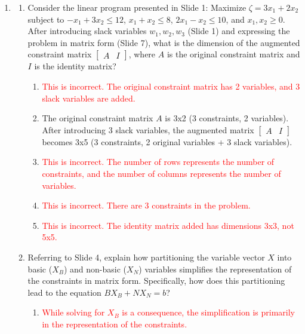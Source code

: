 \documentclass{article}%
\newcommand{\incorrect}[1]{\textcolor{red}{#1}}
\begin{document}
\begin{enumerate}
\begin{enumerate}
\item \incorrect{The initial basic feasible solution can be determined using the given matrix equation.}%
\end{enumerate}%
\vspace{1em}%
\item%
\begin{enumerate}%
\item Consider the linear program presented in Slide 1: Maximize $ \zeta = 3x_1 + 2x_2 $ subject to $ -x_1 + 3x_2 \le 12 $, $ x_1 + x_2 \le 8 $, $ 2x_1 - x_2 \le 10 $, and $ x_1, x_2 \ge 0 $. After introducing slack variables $ w_1, w_2, w_3 $ (Slide 1) and expressing the problem in matrix form (Slide 7), what is the dimension of the augmented constraint matrix $ \begin{bmatrix} A & I \end{bmatrix} $, where $ A $ is the original constraint matrix and $ I $ is the identity matrix?%
\begin{enumerate}%
\item \incorrect{This is incorrect. The original constraint matrix has 2 variables, and 3 slack variables are added.}%
\item The original constraint matrix $A$ is 3x2 (3 constraints, 2 variables).  After introducing 3 slack variables, the augmented matrix $ \begin{bmatrix} A & I \end{bmatrix} $ becomes 3x5 (3 constraints, 2 original variables + 3 slack variables).%
\item \incorrect{This is incorrect. The number of rows represents the number of constraints, and the number of columns represents the number of variables.}%
\item \incorrect{This is incorrect. There are 3 constraints in the problem.}%
\item \incorrect{This is incorrect. The identity matrix added has dimensions 3x3, not 5x5.}%
\end{enumerate}%
\vspace{0.5em}%
\item Referring to Slide 4, explain how partitioning the variable vector $ X $ into basic ($ X_B $) and non-basic ($ X_N $) variables simplifies the representation of the constraints in matrix form.  Specifically, how does this partitioning lead to the equation $ BX_B + NX_N = b $?%
\begin{enumerate}%
\item \incorrect{While solving for $X_B$ is a consequence, the simplification is primarily in the representation of the constraints.}%

\end{enumerate}
\end{enumerate}
\end{enumerate}
\end{document}
